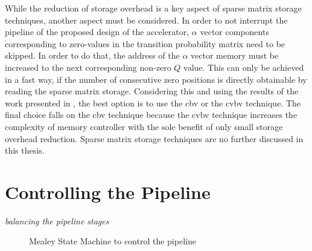 \documentclass[mscthesis]{usiinfthesis}
\begin{document}
While the reduction of storage overhead is a key aspect of sparse matrix
storage techniques, another aspect must be considered. In order to not
interrupt the pipeline of the proposed design of the accelerator, $\alpha$
vector components corresponding to zero-values in the transition probability
matrix need to be skipped. In order to do that, the address of the $\alpha$
vector memory must be increased to the next corresponding non-zero $Q$ value.
This can only be achieved in a fast way, if the number of consecutive zero
positions is directly obtainable by reading the sparse matrix storage.
Considering this and using the results of the work presented in
\cite{FCCM12_Kestur}, the best option is to use the \gls{cbv} or the \gls{cvbv}
technique. The final choice falls on the \gls{cbv} technique because the
\gls{cvbv} technique increases the complexity of memory controller with the
sole benefit of only small storage overhead reduction.  Sparse matrix storage
techniques are no further discussed in this thesis.

\section{Controlling the Pipeline}
\label{ch:design_ctrl}

\emph{\color{red}balancing the pipeline stages}

\begin{figure}
    \centering
    
    \caption{Mealey State Machine to control the pipeline}
    \label{fig:arch_sm}
\end{figure}

\end{document}
